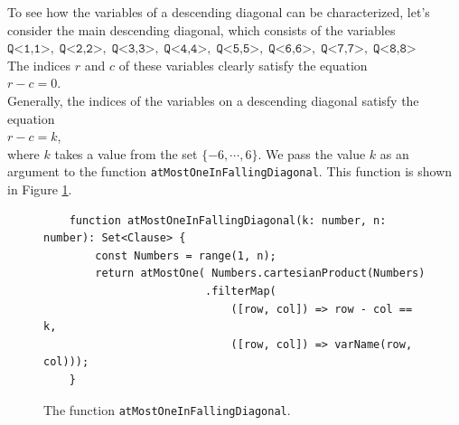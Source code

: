 To see how the variables of a descending diagonal can be characterized, let's consider the main descending diagonal, which consists of the
variables \\[0.2cm]
\hspace*{1.3cm} 
$\texttt{Q<1,1>},\; \texttt{Q<2,2>},\; \texttt{Q<3,3>},\; \texttt{Q<4,4>},\; \texttt{Q<5,5>},\; 
 \texttt{Q<6,6>},\; \texttt{Q<7,7>},\; \texttt{Q<8,8>}$ 
\\[0.2cm]
The indices $r$ and $c$ of these variables clearly satisfy
the equation \\[0.2cm]
\hspace*{1.3cm} $r - c = 0$. \\[0.2cm]
Generally, the indices of the variables on a descending diagonal satisfy the equation \\[0.2cm]
\hspace*{1.3cm} $r - c = k$, \\[0.2cm]
where $k$ takes a value from the set $\{-6, \cdots, 6 \}$. We pass the value $k$ as an argument to the
function \texttt{atMostOneInFallingDiagonal}. This function is shown in Figure
\ref{fig:atMostOneInLowerDiagonal}.

\begin{figure}[!ht]
  \centering
\begin{verbatim}
    function atMostOneInFallingDiagonal(k: number, n: number): Set<Clause> {
        const Numbers = range(1, n);
        return atMostOne( Numbers.cartesianProduct(Numbers)
                         .filterMap(
                             ([row, col]) => row - col == k,
                             ([row, col]) => varName(row, col)));
    }
\end{verbatim}
\vspace*{-0.3cm}
  \caption{The function \texttt{atMostOneInFallingDiagonal}.}
  \label{fig:atMostOneInLowerDiagonal}
\end{figure}


